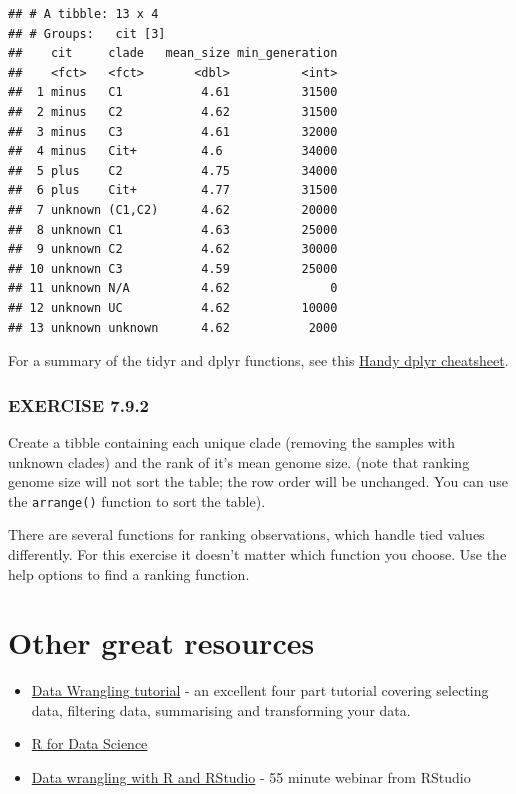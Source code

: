 \documentclass[
]{book}
\providecommand{\tightlist}{%
  \setlength{\itemsep}{0pt}\setlength{\parskip}{0pt}}
\begin{document}
\begin{verbatim}
## # A tibble: 13 x 4
## # Groups:   cit [3]
##    cit     clade   mean_size min_generation
##    <fct>   <fct>       <dbl>          <int>
##  1 minus   C1           4.61          31500
##  2 minus   C2           4.62          31500
##  3 minus   C3           4.61          32000
##  4 minus   Cit+         4.6           34000
##  5 plus    C2           4.75          34000
##  6 plus    Cit+         4.77          31500
##  7 unknown (C1,C2)      4.62          20000
##  8 unknown C1           4.63          25000
##  9 unknown C2           4.62          30000
## 10 unknown C3           4.59          25000
## 11 unknown N/A          4.62              0
## 12 unknown UC           4.62          10000
## 13 unknown unknown      4.62           2000
\end{verbatim}

For a summary of the tidyr and dplyr functions, see this \href{http://www.rstudio.com/wp-content/uploads/2015/02/data-wrangling-cheatsheet.pdf}{Handy dplyr cheatsheet}.

\hypertarget{exercise-7.9.2}{%
\subsubsection*{EXERCISE 7.9.2}\label{exercise-7.9.2}}

Create a tibble containing each unique clade (removing the samples with unknown clades) and the rank of it's mean genome size. (note that ranking genome size will not sort the table; the row order will be unchanged. You can use the \texttt{arrange()} function to sort the table).

There are several functions for ranking observations, which handle tied values differently. For this exercise it doesn't matter which function you choose. Use the help options to find a ranking function.

\hypertarget{other-great-resources}{%
\section{Other great resources}\label{other-great-resources}}

\begin{itemize}
\tightlist
\item
  \href{https://suzan.rbind.io/categories/tutorial/}{Data Wrangling tutorial} - an excellent four part tutorial covering selecting data, filtering data, summarising and transforming your data.
\item
  \href{http://r4ds.had.co.nz/}{R for Data Science}
\item
  \href{https://www.rstudio.com/resources/webinars/data-wrangling-with-r-and-rstudio/}{Data wrangling with R and RStudio} - 55 minute webinar from RStudio
\end{itemize}
\end{document}
